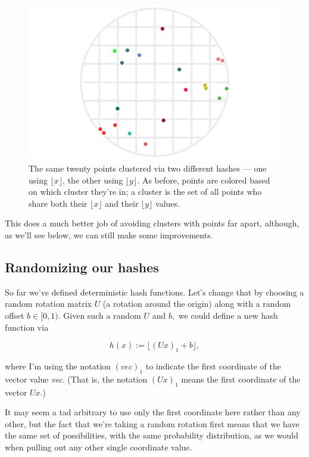 \documentclass[20pt,]{extarticle}
\begin{document}
\begin{figure}
\centering
\includegraphics{images/lsh_image3.png}
\caption{The same twenty points clustered via two different hashes ---
one using \(\lfloor x\rfloor\), the other using \(\lfloor y\rfloor.\) As
before, points are colored based on which cluster they're in; a cluster
is the set of all points who share both their \(\lfloor x\rfloor\) and
their \(\lfloor y\rfloor\) values.}\label{fig:fig3}
\end{figure}

This does a much better job of avoiding clusters with points far apart,
although, as we'll see below, we can still make some improvements.

\subsection{Randomizing our hashes}\label{randomizing-our-hashes}

So far we've defined deterministic hash functions. Let's change that by
choosing a random rotation matrix \(U\) (a rotation around the origin)
along with a random offset \(b \in [0, 1).\) Given such a random \(U\)
and \(b,\) we could define a new hash function via

\[ h(x) := \lfloor (Ux)_1 + b \rfloor, \]

where I'm using the notation \(( \textit{vec} )_1\) to indicate the
first coordinate of the vector value \emph{vec}. (That is, the notation
\((Ux)_1\) means the first coordinate of the vector \(Ux\).)

It may seem a tad arbitrary to use only the first coordinate here rather
than any other, but the fact that we're taking a random rotation first
means that we have the same set of possibilities, with the same
probability distribution, as we would when pulling out any other single
coordinate value.
\end{document}
